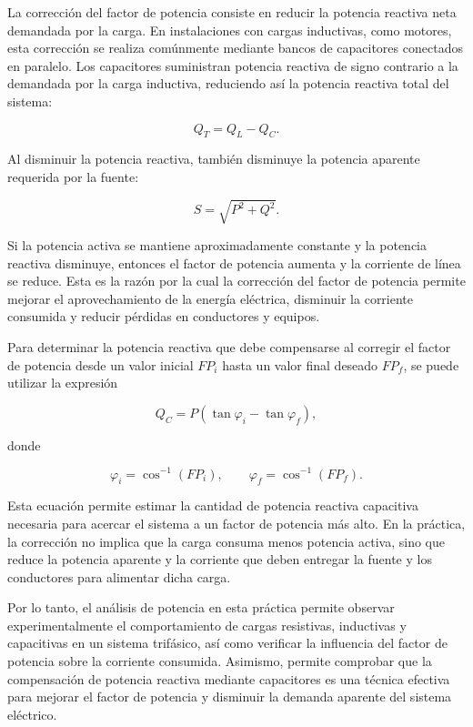 	La corrección del factor de potencia consiste en reducir la potencia reactiva neta demandada por la carga. En instalaciones con cargas inductivas, como motores, esta corrección se realiza comúnmente mediante bancos de capacitores conectados en paralelo. Los capacitores suministran potencia reactiva de signo contrario a la demandada por la carga inductiva, reduciendo así la potencia reactiva total del sistema:
	
	\[
	Q_T = Q_L - Q_C.
	\]
	
	Al disminuir la potencia reactiva, también disminuye la potencia aparente requerida por la fuente:
	
	\[
	S = \sqrt{P^2+Q^2}.
	\]
	
	Si la potencia activa se mantiene aproximadamente constante y la potencia reactiva disminuye, entonces el factor de potencia aumenta y la corriente de línea se reduce. Esta es la razón por la cual la corrección del factor de potencia permite mejorar el aprovechamiento de la energía eléctrica, disminuir la corriente consumida y reducir pérdidas en conductores y equipos.
	
	Para determinar la potencia reactiva que debe compensarse al corregir el factor de potencia desde un valor inicial $FP_i$ hasta un valor final deseado $FP_f$, se puede utilizar la expresión
	
	\[
	Q_C = P\left(\tan\varphi_i-\tan\varphi_f\right),
	\]
	
	donde
	
	\[
	\varphi_i=\cos^{-1}(FP_i),
	\qquad
	\varphi_f=\cos^{-1}(FP_f).
	\]
	
	Esta ecuación permite estimar la cantidad de potencia reactiva capacitiva necesaria para acercar el sistema a un factor de potencia más alto. En la práctica, la corrección no implica que la carga consuma menos potencia activa, sino que reduce la potencia aparente y la corriente que deben entregar la fuente y los conductores para alimentar dicha carga.
	
	Por lo tanto, el análisis de potencia en esta práctica permite observar experimentalmente el comportamiento de cargas resistivas, inductivas y capacitivas en un sistema trifásico, así como verificar la influencia del factor de potencia sobre la corriente consumida. Asimismo, permite comprobar que la compensación de potencia reactiva mediante capacitores es una técnica efectiva para mejorar el factor de potencia y disminuir la demanda aparente del sistema eléctrico.